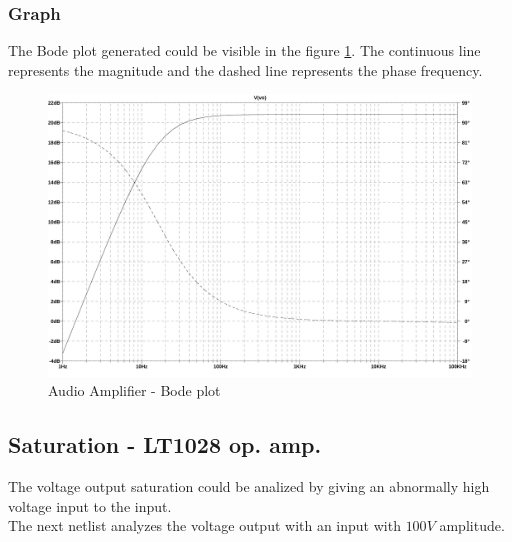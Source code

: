 \documentclass[10pt,a4paper]{article}
\begin{document}
\subsubsection{Graph}
The Bode plot generated could be visible in the figure \ref{1d3graph}.
The continuous line represents the magnitude and the dashed line represents the phase frequency.\\
\begin{figure}[H]
  \centering
  \includegraphics[width=14cm]{graph/1d3.jpg}
  \caption{Audio Amplifier - Bode plot}
  \label{1d3graph}
\end{figure}

\subsection{Saturation - LT1028 op. amp.}
The voltage output saturation could be analized by giving an abnormally high voltage input to the input.\\
The next netlist analyzes the voltage output with an input with $100V$ amplitude.\\


\end{document}
